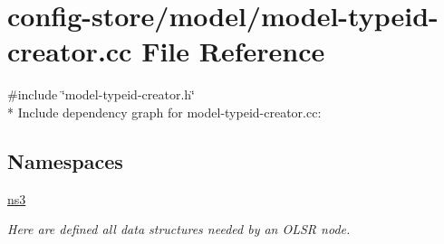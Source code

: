 \hypertarget{model-typeid-creator_8cc}{}\section{config-\/store/model/model-\/typeid-\/creator.cc File Reference}
\label{model-typeid-creator_8cc}
{\ttfamily \#include \char`\"{}model-\/typeid-\/creator.\+h\char`\"{}}\\*
Include dependency graph for model-\/typeid-\/creator.cc\+:
\subsection*{Namespaces}
\begin{DoxyCompactItemize}
\item 
 \hyperlink{namespacens3}{ns3}
\begin{DoxyCompactList}\small\item\em Here are defined all data structures needed by an O\+L\+SR node. \end{DoxyCompactList}\end{DoxyCompactItemize}
